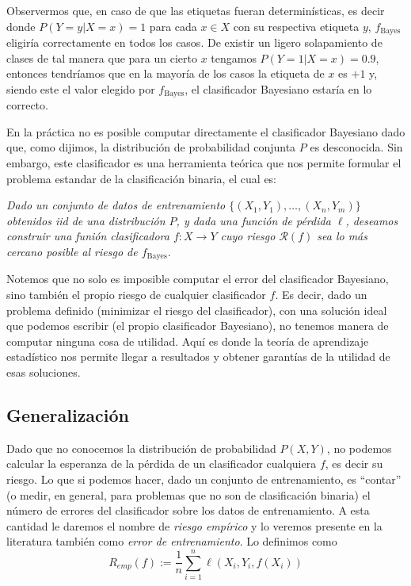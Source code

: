 \documentclass{report}
\begin{document}
Observermos que, en caso de que las etiquetas fueran determinísticas, es decir donde $P(Y=y|X=x)=1$ para cada $x\in X$ con su
respectiva etiqueta $y$, $f_{\text{Bayes}}$ eligiría correctamente en todos los casos. De existir un ligero solapamiento de clases 
de tal manera que para un cierto $x$ tengamos $P(Y=1|X=x) = 0.9$, entonces tendríamos
que en la mayoría de los casos la etiqueta de $x$ es $+1$ y, siendo este el valor elegido por $f_{\text{Bayes}}$, el clasificador
Bayesiano estaría en lo correcto.

En la práctica no es posible computar directamente el clasificador Bayesiano dado que, como dijimos, la distribución de probabilidad
conjunta $P$ es desconocida. Sin embargo, este clasificador es una herramienta teórica que nos permite formular el problema
estandar de la clasificación binaria, el cual es:

\textit{Dado un conjunto de datos de entrenamiento $ \{ (X_1,Y_1),\dots,(X_n, Y_m)\}$ obtenidos iid de una distribución $P$, y dada una
función de pérdida $\ell$, deseamos construir una funión clasificadora $f:X\rightarrow Y$ cuyo riesgo $\mathcal{R}(f)$ sea lo
más cercano posible al riesgo de $f_{\text{Bayes}}$.}

Notemos que no solo es imposible computar el error del clasificador Bayesiano, sino también el propio riesgo de cualquier clasificador
$f$. Es decir, dado un problema definido (minimizar el riesgo del clasificador), con una solución ideal que podemos escribir (el propio
clasificador Bayesiano), no tenemos manera de computar ninguna cosa de utilidad. Aquí es donde la teoría de aprendizaje estadístico
nos permite llegar a resultados y obtener garantías de la utilidad de esas soluciones.

\subsection{Generalización}

Dado que no conocemos la distribución de probabilidad $P(X,Y)$, no podemos calcular la esperanza de la pérdida de un clasificador cualquiera
$f$, es decir su riesgo. Lo que si podemos hacer, dado un conjunto de entrenamiento, es ``contar'' (o medir, en general, para problemas
que no son de clasificación binaria) el número de errores del clasificador sobre los datos de entrenamiento. A esta cantidad le daremos
el nombre de \textit{riesgo empírico} y lo veremos presente en la literatura también como \textit{error de entrenamiento}. Lo definimos
como
\[
R_{emp}(f) := \frac{1}{n} \sum_{i=1}^n \ell(X_i,Y_i,f(X_i))
\]
\end{document}
